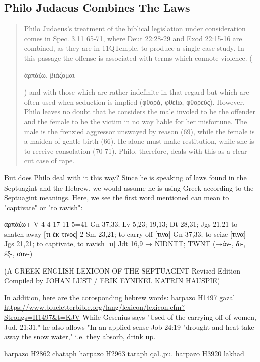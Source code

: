 \documentclass[11pt]{article}
\begin{document}
\subsection{Philo Judaeus Combines The Laws}

\begin{quote}
Philo Judaeus's treatment of the biblical legislation under consideration comes in Spec. 3.11 65-71, where Deut 22:28-29 and Exod 22:15-16 are combined, as they are in 11QTemple, to produce a single case study. In this passage the offense is associated with terms which connote violence. (\begin{greek}ἁρπάζω, βιάζομαι\end{greek}) and with those which are rather indefinite in that regard but which are often used when seduction is implied (φθορά, φθεἱω, φθορεύς). However, Philo leaves no doubt that he considers the male involed to be the offender and the female to be the victim in no way liable for her misfortune. The male is the frenzied aggressor unswayed by reason (69), while the female is a maiden of gentle birth (66). He alone must make restitution, while she is to receive consolation (70-71). Philo, therefore, deals with this as a clear-cut case of rape.
\end{quote}
But does Philo deal with it this way? Since he is speaking of laws found in the Septuagint and the Hebrew, we would assume he is using Greek according to the Septuagint meanings. Here, we see the first word mentioned can mean to "captivate" or "to ravish":

\begin{greek} ἁρπάζω+ V 4-4-17-11-5=41
Gn 37,33; Lv 5,23; 19,13; Dt 28,31; Jgs 21,21
to snatch away [τι ἔκ τινος] 2 Sm 23,21; to carry off [τινα] Gn 37,33; to seize [τινα] Jgs 21,21; to
captivate, to ravish [τι] Jdt 16,9
→ NIDNTT; TWNT
(→ἀν-, δι-, ἐξ-, συν-) 
\end{greek}
(A GREEK-ENGLISH LEXICON
OF THE SEPTUAGINT
Revised Edition
Compiled by
JOHAN LUST / ERIK EYNIKEL
KATRIN HAUSPIE)




In addition, here are the corosponding hebrew words:
harpazo H1497 gazal
\url{https://www.blueletterbible.org/lang/lexicon/lexicon.cfm?Strongs=H1497&t=KJV}
While Gesenius says "Used of the carrying off of women, Jud. 21:31." he also allows "In an applied sense Job 24:19 "drought and heat take away the snow water," i.e. they absorb, drink up.

harpazo H2862 chataph
harpazo H2963 taraph qal.,pu.
harpazo H3920 lakhad
\end{document}

